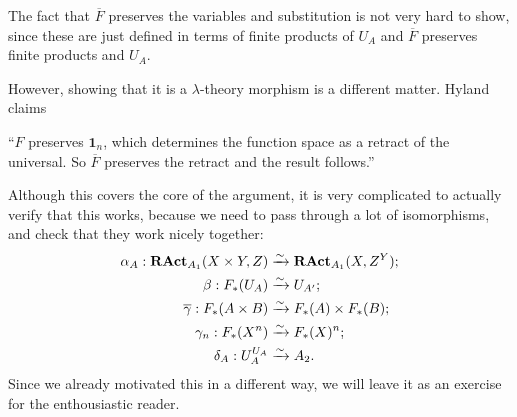 \begin{remark}
  The fact that $ \overline F $ preserves the variables and substitution is not very hard to show, since these are just defined in terms of finite products of $ U_A $ and $ \overline F $ preserves finite products and $ U_A $.

  However, showing that it is a $ \lambda $-theory morphism is a different matter. Hyland claims

  \enquote{$ F $ preserves $ \mathbf 1_n $, which determines the function space as a retract of the universal. So $ \overline F $ preserves the retract and the result follows.}

  Although this covers the core of the argument, it is very complicated to actually verify that this works, because we need to pass through a lot of isomorphisms, and check that they work nicely together:
  \begin{align*}
    \alpha_A: \mathbf{RAct}_{A_1}(X \times Y, Z) &\xrightarrow{\sim} \mathbf{RAct}_{A_1}(X, Z^Y);\\
    \beta: F_*(U_A) &\xrightarrow{\sim} U_{A^\prime};\\
    \overline \gamma: F_*(A \times B) &\xrightarrow{\sim} F_*(A) \times F_*(B);\\
    \gamma_n: F_*(X^n) &\xrightarrow{\sim} F_*(X)^n;\\
    \delta_A: U_A^{U_A} &\xrightarrow{\sim} A_2.
  \end{align*}
  Since we already motivated this in a different way, we will leave it as an exercise for the enthousiastic reader.

\end{remark}
